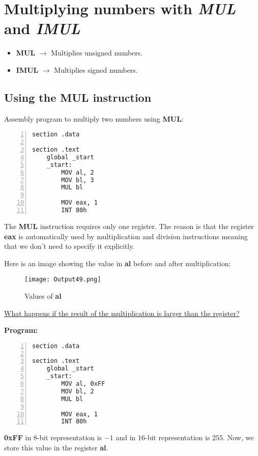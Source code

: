 \documentclass{article}
\makeatletter
\renewcommand\paragraph{\@startsection{paragraph}{4}{\z@}{-3.25ex \@plus -1ex \@minus -.2ex}{1.5ex \@plus .2ex}{\normalfont\normalsize\bfseries}}
\makeatother
\begin{document}
\section{Multiplying numbers with \textit{MUL} and \textit{IMUL}}\label{sec:sec1}
\paragraph{}

\begin{itemize}
\item \textbf{MUL} $\rightarrow$ Multiplies unsigned numbers.

\item \textbf{IMUL} $\rightarrow$ Multiplies signed numbers.
\end{itemize}

\subsection{Using the \textbf{MUL} instruction}\label{sec:subsec1}
\paragraph{}
Assembly program to multiply two numbers using \textbf{MUL}:
\begin{Verbatim}[numbers=left, frame=single]
section .data

section .text
	global _start
	_start:
		MOV al, 2
		MOV bl, 3
		MUL bl
		
		MOV eax, 1
		INT 80h
\end{Verbatim}
The \textbf{MUL} instruction requires only one register. The reason is that the register \textbf{eax} is automatically used by multiplication and division instructions meaning that we don't need to specify it explicitly.

Here is an image showing the value in \textbf{al} before and after multiplication:
\begin{figure}[h]
\centering
\texttt{[image: Output49.png]}
\caption{Values of \textbf{al}}
\label{fig:fig1}
\end{figure}

\newpage
\underline{What happens if the result of the multiplication is larger than the register?}

\textbf{Program:}
\begin{Verbatim}[numbers=left, frame=single]
section .data

section .text
	global _start
	_start:
		MOV al, 0xFF
		MOV bl, 2
		MUL bl
		
		MOV eax, 1
		INT 80h
\end{Verbatim}
\textbf{0xFF} in $8$-bit representation is $-1$ and in $16$-bit representation is $255$. Now, we store this value in the register \textbf{al}.
\end{document}
